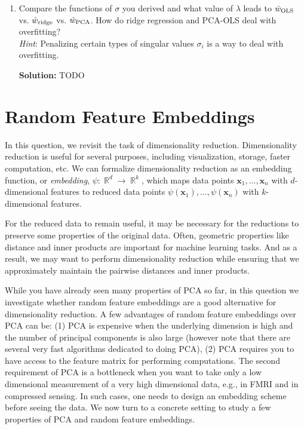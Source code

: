 \documentclass{article}
\newcommand{\Question}[1]{\Large \section{ #1 } \normalsize}
\DeclareMathOperator{\R}{\mathbb{R}}
\renewcommand{\vec}[1]{\boldsymbol{\mathbf{#1}}}
\newenvironment{solution}{\color{blue} \smallskip \textbf{Solution:}}{}
\begin{document}
\begin{enumerate}
\newpage
\item 
Compare the functions of $\sigma$ you derived and what value of $\lambda$ leads to $\hat{{w}}_{\text{OLS}}$ vs. $\hat{{w}}_{\text{ridge}}$ vs. $\hat{ {w}}_\text{{PCA}}$. How do ridge regression and PCA-OLS deal with overfitting?\\
\textit{Hint}: Penalizing certain types of singular values $\sigma_i$ is a way to deal with overfitting.

\begin{solution}
    TODO
\end{solution}
\end{enumerate}


\newpage
\Question {Random Feature Embeddings}

\newcommand{\num}{n}
\newcommand{\dims}{d}

In this question, we revisit the task of dimensionality reduction.
Dimensionality reduction is useful for several purposes, including visualization, storage, faster computation, etc. We can formalize dimensionality reduction as an embedding function, or \emph{embedding}, $\psi: \R^d \to \R^k$, which maps data points $\vec x_1,\dots,\vec x_n$ with $d$-dimensional features to reduced data points $\psi(\vec x_1),\dots,\psi(\vec x_n)$ with $k$-dimensional features. 


For the reduced data to remain useful, it may be necessary for the reductions to preserve some properties of the original data.
Often, geometric properties like distance and inner products
are important for machine learning tasks.
And as a result, we may want to perform dimensionality reduction
while ensuring that we approximately maintain the pairwise distances
and inner products.

While you have already seen many properties of PCA so far, in this question
we investigate whether random feature embeddings are a good alternative for dimensionality
reduction.
A few advantages of random feature embeddings over PCA can be:
(1) PCA is expensive when the underlying dimension is high
and the number of principal components is also large (however note that
there are several very fast algorithms dedicated to doing PCA), 
(2) PCA requires you to have access to the feature matrix for performing
computations. The second requirement of PCA is a bottleneck
when you want to take only a low dimensional measurement of a very
high dimensional data, e.g., in FMRI and in compressed sensing.
In such cases, one needs to design an embedding scheme before seeing the data.
We now turn to a concrete setting to study a few properties of PCA
and random feature embeddings.
\end{document}
